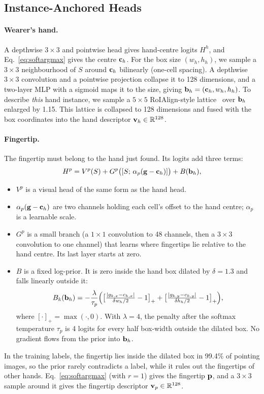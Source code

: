\subsection{Instance-Anchored Heads}\label{sec:heads}

\paragraph{Wearer's hand.} A depthwise $3\times3$ and pointwise head gives hand-centre logits $H^h$, and Eq.~\eqref{eq:softargmax} gives the centre $\mathbf{c}_h$. For the box size $(w_h,h_h)$, we sample a $3\times3$ neighbourhood of $S$ around $\mathbf{c}_h$ bilinearly (one-cell spacing). A depthwise $3\times3$ convolution and a pointwise projection collapse it to 128 dimensions, and a two-layer MLP with a sigmoid maps it to the size, giving $\mathbf{b}_h=(\mathbf{c}_h,w_h,h_h)$. To describe \emph{this} hand instance, we sample a $5\times5$ RoIAlign-style lattice~\cite{he2017mask} over $\mathbf{b}_h$ enlarged by 1.15. This lattice is collapsed to 128 dimensions and fused with the box coordinates into the hand descriptor $\mathbf{v}_h\in\mathbb{R}^{128}$.

\paragraph{Fingertip.} The fingertip must belong to the hand just found. Its logits add three terms:
\begin{equation}
H^p = V^p(S) + G^p\big([S;\,\alpha_p(\mathbf{g}-\mathbf{c}_h)]\big) + B(\mathbf{b}_h),
\label{eq:tip}
\end{equation}
\begin{itemize}
\item $V^p$ is a visual head of the same form as the hand head.
\item $\alpha_p(\mathbf{g}-\mathbf{c}_h)$ are two channels holding each cell's offset to the hand centre; $\alpha_p$ is a learnable scale.
\item $G^p$ is a small branch (a $1\times1$ convolution to 48 channels, then a $3\times3$ convolution to one channel) that learns where fingertips lie relative to the hand centre. Its last layer starts at zero.
\item $B$ is a fixed log-prior. It is zero inside the hand box dilated by $\delta{=}1.3$ and falls linearly outside it:
\begin{equation}
B_k(\mathbf{b}_h) = -\frac{\lambda}{\tau_p}\Big(\big[\tfrac{|g_{k,x}-c_{h,x}|}{\delta w_h/2}-1\big]_+ + \big[\tfrac{|g_{k,y}-c_{h,y}|}{\delta h_h/2}-1\big]_+\Big),
\end{equation}
where $[\cdot]_+=\max(\cdot,0)$. With $\lambda{=}4$, the penalty after the softmax temperature $\tau_p$ is 4 logits for every half box-width outside the dilated box. No gradient flows from the prior into $\mathbf{b}_h$.
\end{itemize}
In the training labels, the fingertip lies inside the dilated box in 99.4\% of pointing images, so the prior rarely contradicts a label, while it rules out the fingertips of other hands. Eq.~\eqref{eq:softargmax} (with $r{=}1$) gives the fingertip $\mathbf{p}$, and a $3\times3$ sample around it gives the fingertip descriptor $\mathbf{v}_p\in\mathbb{R}^{128}$.

